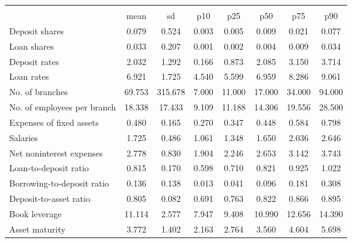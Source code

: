 {
\def\sym#1{\ifmmode^{#1}\else\(^{#1}\)\fi}
\begin{tabular*}{\hsize}{@{\hskip\tabcolsep\extracolsep\fill}l*{1}{ccccccc}}
\toprule
                    &\multicolumn{7}{c}{}                                                                      \\
                    &        mean&          sd&         p10&         p25&         p50&         p75&         p90\\
\midrule
Deposit shares      &       0.079&       0.524&       0.003&       0.005&       0.009&       0.021&       0.077\\
\addlinespace
Loan shares         &       0.033&       0.207&       0.001&       0.002&       0.004&       0.009&       0.034\\
\addlinespace
Deposit rates       &       2.032&       1.292&       0.166&       0.873&       2.085&       3.150&       3.714\\
\addlinespace
Loan rates          &       6.921&       1.725&       4.540&       5.599&       6.959&       8.286&       9.061\\
\addlinespace
No. of branches     &      69.753&     315.678&       7.000&      11.000&      17.000&      34.000&      94.000\\
\addlinespace
No. of employees per branch&      18.338&      17.433&       9.109&      11.188&      14.306&      19.556&      28.500\\
\addlinespace
Expenses of fixed assets&       0.480&       0.165&       0.270&       0.347&       0.448&       0.584&       0.798\\
\addlinespace
Salaries            &       1.725&       0.486&       1.061&       1.348&       1.650&       2.036&       2.646\\
\addlinespace
Net noninterest expenses&       2.778&       0.830&       1.904&       2.246&       2.653&       3.142&       3.743\\
\addlinespace
Loan-to-deposit ratio&       0.815&       0.170&       0.598&       0.710&       0.821&       0.925&       1.022\\
\addlinespace
Borrowing-to-deposit ratio&       0.136&       0.138&       0.013&       0.041&       0.096&       0.181&       0.308\\
\addlinespace
Deposit-to-asset ratio&       0.805&       0.082&       0.691&       0.763&       0.822&       0.866&       0.895\\
\addlinespace
Book leverage       &      11.114&       2.577&       7.947&       9.408&      10.990&      12.656&      14.390\\
\addlinespace
Asset maturity      &       3.772&       1.402&       2.163&       2.764&       3.560&       4.604&       5.698\\
\bottomrule
\end{tabular*}
}
